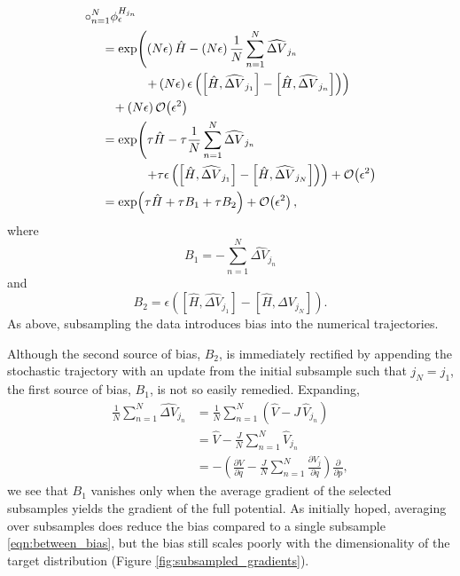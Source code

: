 \documentclass{article}
\begin{document}
%
\begin{align*}
\circ_{n = 1}^{N} \phi^{H_{j_{n}}}_{\epsilon}
& \\
& \hspace{-10mm} =
\exp \! \left( 
\left( N \epsilon \right) \hat{H} 
- \left( N \epsilon \right) \frac{1}{N} \sum_{n = 1}^{N}  \widehat{ \Delta V}_{j_{n}}
\right.
\\
& \hspace{2mm} \left.
+ \left( N \epsilon \right) \epsilon 
\left( \left[ \hat{H}, \widehat{ \Delta V}_{j_{1}} \right] 
- \left[ \hat{H}, \widehat{ \Delta V}_{j_{n}} \right] \right) 
\right)
\\
& \hspace{-7mm}
+ \left(N \epsilon \right) \mathcal{O} \! \left( \epsilon^{2} \right)
\\
& \hspace{-10mm} =
\exp \! \left( \tau \hat{H} - \tau \frac{1}{N} \sum_{n = 1}^{N} \widehat{ \Delta V}_{j_{n}}
\right.
\\
& \hspace{2mm} \left.
+ \tau \epsilon 
\left( \left[ \hat{H}, \widehat{ \Delta V}_{j_{1}} \right] 
- \left[ \hat{H}, \widehat{ \Delta V}_{j_{N}} \right] \right)
\right)
+ \mathcal{O} \! \left( \epsilon^{2} \right)
\\
& \hspace{-10mm} =
\exp \! \left( \tau \hat{H} + \tau B_{1} + \tau B_{2} \right)
+ \mathcal{O} \! \left( \epsilon^{2} \right),
\end{align*}
%
where
%
\begin{equation*}
B_{1} = - \sum_{n = 1}^{N} \widehat{ \Delta V}_{j_{n}}
\end{equation*}
%
and
%
\begin{equation*}
B_{2} = \epsilon 
\left( \left[ \hat{H}, \widehat{ \Delta V}_{j_{1}} \right] 
- \left[ \hat{H}, \widehat{ \Delta V}_{j_{N}} \right] \right).
\end{equation*}
%
As above, subsampling the data introduces bias into the numerical trajectories.

Although the second source of bias, $B_{2}$, is immediately rectified by appending the 
stochastic trajectory with an update from the initial subsample such that $j_{N} = j_{1}$, 
the first source of bias, $B_{1}$, is not so easily remedied.  Expanding,
%
\begin{align*}
\frac{1}{N} \sum_{n = 1}^{N}  \widehat{ \Delta V}_{j_{n}}
&=
\frac{1}{N} \sum_{n = 1}^{N} \left( \hat{V} - J \, \hat{V}_{j_{n}} \right)
\\
&=
\hat{V} - \frac{J}{N} \sum_{n = 1}^{N} \hat{V}_{j_{n}}
\\
&=
- \left( \frac{ \partial V }{ \partial q }  - \frac{J}{N} \sum_{n = 1}^{N} \frac{ \partial V_{j} }{ \partial q }
\right) \frac{ \partial }{ \partial p },
\end{align*}
%
we see that $B_{1}$ vanishes only when the average gradient of the selected 
subsamples yields the gradient of the full potential.  As initially hoped, averaging 
over subsamples does reduce the bias compared to a single subsample 
\eqref{eqn:between_bias}, but the bias still scales poorly with the dimensionality
of the target distribution (Figure \ref{fig:subsampled_gradients}).
\end{document}
